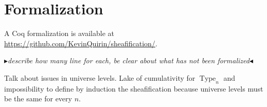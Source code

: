 \documentclass[conference]{IEEEtran}
\newcommand{\mynote}[2]{
    \fbox{\bfseries\sffamily\scriptsize#1}
    {\small$\blacktriangleright$\textsf{\emph{#2}}$\blacktriangleleft$}~}
\newcommand\nt[1]{\mynote{NT}{#1}}
\DeclareMathOperator{\Type}{Type}
\begin{document}
%



\section{Formalization} 
\label{sec:formalization}

A Coq formalization is available at
\url{https://github.com/KevinQuirin/sheafification/}.

\nt{describe how many line for each, be clear about what has not been formalized}

Talk about issues in universe levels. Lake of cumulativity for
$\Type_n$ and impossibility to define by induction the sheafification 
because universe levels must be the same for every $n$.
\end{document}
